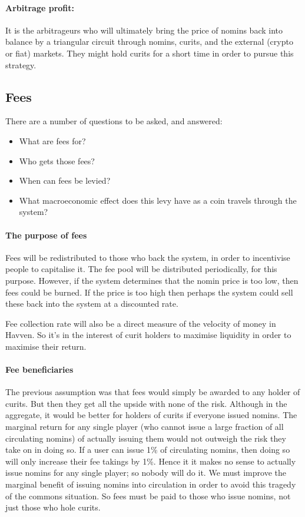 \documentclass{article}
\begin{document}
\paragraph{Arbitrage profit:}
It is the arbitrageurs who will ultimately bring the price of nomins back into balance by a triangular circuit
through nomins, curits, and the external (crypto or fiat) markets. They might hold curits for a short time in order
to pursue this strategy.


\pagebreak
\subsection{Fees}
There are a number of questions to be asked, and answered:
\begin{itemize}
    \item What are fees for?
    \item Who gets those fees?
    \item When can fees be levied?
    \item What macroeconomic effect does this levy have as a coin travels through the system?
\end{itemize}

\paragraph{The purpose of fees}
Fees will be redistributed to those who back the system, in order to incentivise people to capitalise it.
The fee pool will be distributed periodically, for this purpose.
However, if the system determines that the nomin price is too low, then fees could be burned. If the price is
too high then perhaps the system could sell these back into the system at a discounted rate.

Fee collection rate will also be a direct measure of the velocity of money in Havven. So it's in the interest
of curit holders to maximise liquidity in order to maximise their return.

\paragraph{Fee beneficiaries}
The previous assumption was that fees would simply be awarded to any holder of curits. But then they
get all the upside with none of the risk. Although in the aggregate, it would be better for holders of 
curits if everyone issued nomins. The marginal return for any single player (who cannot issue a 
large fraction of all circulating nomins) of actually issuing them would not outweigh the risk they take
on in doing so. If a user can issue 1\% of circulating nomins, then doing so will only increase their
fee takings by 1\%.
Hence it it makes no sense to actually issue nomins for any single player; so nobody will do it.
We must improve the marginal benefit of issuing nomins into circulation in order to avoid
this tragedy of the commons situation. So fees must be paid to those who issue nomins, not just
those who hole curits.
\end{document}
